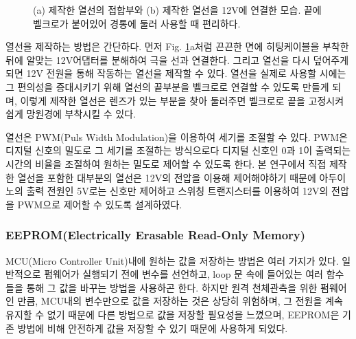\begin{figure}[h]
	\begin{center}
	\end{center}
	\caption{(a) 제작한 열선의 접합부와 (b) 제작한 열선을 12V에 연결한 모습. 끝에 벨크로가 붙어있어 경통에 둘러 사용할 때 편리하다.}
	\label{thermic}
\end{figure}


열선을 제작하는 방법은 간단하다. 먼저 Fig. \ref{thermic}a처럼 끈끈한 면에 히팅케이블을 부착한 뒤에 알맞는 12V어댑터를 분해하여 극을 선과 연결한다. 그리고 열선을 다시 덮어주게 되면 12V 전원을 통해 작동하는 열선을 제작할 수 있다. 열선을 실제로 사용할 시에는 그 편의성을 증대시키기 위해 열선의 끝부분을 벨크로로 연결할 수 있도록 만들게 되며, 이렇게 제작한 열선은 렌즈가 있는 부분을 찾아 둘러주면 벨크로로 끝을 고정시켜 쉽게 망원경에 부착시킬 수 있다.

열선은 PWM(Puls Width Modulation)을 이용하여 세기를 조절할 수 있다. PWM은 디지털 신호의 밀도로 그 세기를 조절하는 방식으로다 디지털 신호인 0과 1이 출력되는 시간의 비율을 조절하여 원하는 밀도로 제어할 수 있도록 한다. 본 연구에서 직접 제작한 열선을 포함한 대부분의 열선은 12V의 전압을 이용해 제어해야하기 때문에 아두이노의 출력 전원인 5V로는 신호만 제어하고 스위칭 트랜지스터를 이용하여 12V의 전압을 PWM으로 제어할 수 있도록 설계하였다.

\subsubsection{EEPROM(Electrically Erasable Read-Only Memory)}

MCU(Micro Controller Unit)내에 원하는 값을 저장하는 방법은 여러 가지가 있다. 일반적으로 펌웨어가 실행되기 전에 변수를 선언하고, loop 문 속에 들어있는 여러 함수들을 통해 그 값을 바꾸는 방법을 사용하곤 한다. 하지만 원격 천체관측을 위한 펌웨어인 만큼, MCU내의 변수만으로 값을 저장하는 것은 상당히 위험하며, 그 전원을 계속 유지할 수 없기 때문에 다른 방법으로 값을 저장할 필요성을 느꼈으며, EEPROM은 기존 방법에 비해 안전하게 값을 저장할 수 있기 때문에 사용하게 되었다.

